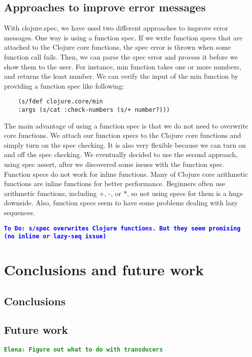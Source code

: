 \documentclass[12pt]{article}
\newcommand{\comment}[1]{{\bf \tt  {#1}}}
\newcommand{\emcomment}[1]{\textcolor{ForestGreen}{\comment{Elena: {#1}}}}
\newcommand{\todo}[1]{\textcolor{blue}{\comment{To Do: {#1}}}}
\begin{document}
	\subsection{Approaches to improve error messages}
	With clojure.spec, we have used two different approaches to improve error messages. One way is using a function spec. 
	If we write function specs that are attached to the Clojure core functions, the spec error is thrown when some function 
	call fails. Then, we can parse the spec error and process it before we show them to the user. For instance, min function 
	takes one or more numbers, and returns the least number. We can verify the input of the min function by providing a 
	function spec like following:

	\begin{verbatim}
	(s/fdef clojure.core/min
	:args (s/cat :check-numbers (s/+ number?)))
	\end{verbatim}

	The main advantage of using a function spec is that we do not need to overwrite core functions. We attach our 
	function specs to the Clojure core functions and simply turn on the spec checking. It is also very flexible because we 
	can turn on and off the spec checking. We eventually decided to use the second approach, using spec assert, after we 
	discovered some issues with the function spec. Function specs do not work for inline functions. Many of Clojure core 
	arithmetic functions are inline functions for better performance. Beginners often use arithmetic functions, including +, -, 
	or *, so not using specs for them is a huge downside. Also, function specs seem to have some problems dealing with 
	lazy sequences. 

	\todo{s/spec overwrites Clojure functions. But they seem promising (no inline or lazy-seq issue)}

\section{Conclusions and future work}
	\subsection{Conclusions}
	\subsection{Future work}
\emcomment{Figure out what to do with transducers}
	


\end{document}
